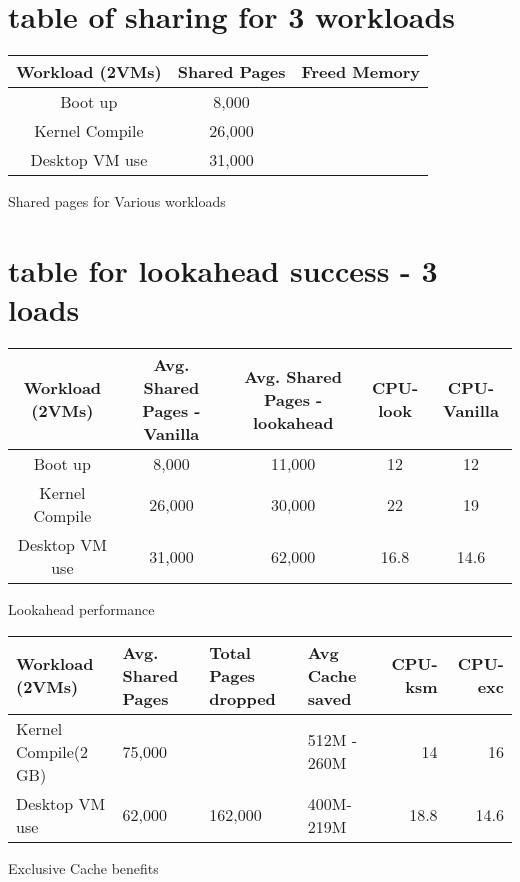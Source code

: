 \documentclass[11pt]{article}
\begin{document}
\section{table of sharing for 3 workloads}
\label{sec-2}



\begin{center}
\begin{tabular}{|c|c|c|}
 Workload (2VMs)  &  Shared Pages  &  Freed Memory  \\
\hline
 Boot up          &  8,000         &                \\
 Kernel Compile   &  26,000        &                \\
 Desktop VM use   &  31,000        &                \\
\end{tabular}
\caption{Shared pages for Various workloads}
\end{center}
\section{table for lookahead success - 3 loads}
\label{sec-3}




\begin{center}
\begin{tabular}{|c|c|c|c|c|}
 Workload (2VMs)  &  Avg. Shared Pages - Vanilla  &  Avg. Shared Pages - lookahead  &  CPU-look  &  CPU-Vanilla  \\
\hline
 Boot up          &  8,000                        &  11,000                         &        12  &           12  \\
 Kernel Compile   &  26,000                       &  30,000                         &        22  &           19  \\
 Desktop VM use   &  31,000                       &  62,000                         &      16.8  &         14.6  \\
\end{tabular}
\caption{Lookahead performance}
\end{center}


  

\begin{center}
\begin{tabular}{llllrr}
 Workload  (2VMs)      &  Avg. Shared Pages  &  Total Pages dropped  &  Avg Cache saved  &  CPU-ksm  &  CPU-exc  \\
\hline
 Kernel Compile(2 GB)  &  75,000             &                       &  512M - 260M      &       14  &       16  \\
 Desktop VM use        &  62,000             &  162,000              &  400M- 219M       &     18.8  &     14.6  \\
\end{tabular}
\caption{Exclusive Cache benefits}
\end{center}
\end{document}

